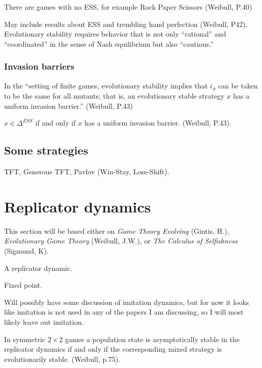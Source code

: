 There are games with no ESS, for example Rock Paper Scissors (Weibull, P.40)

May include results about ESS and trembling hand perfection (Weibull, P42). Evolutionary stability requires behavior that is not only ``rational'' and ``coordinated'' in the sense of Nash equilibrium but also ``cautious.''

\subsubsection{Invasion barriers}
In the ``setting of finite games, evolutionary stability implies that $\bar{\epsilon}_y$ can be taken to be the same for all mutants; that is, an evolutionary stable strategy $x$ has a uniform invasion barrier.'' (Weibull, P.43)
\begin{proposition}
$x \in \Delta^{ESS}$ if and only if $x$ has a uniform invasion barrier. (Weibull, P.43).
\end{proposition}


\subsection{Some strategies}
TFT, Generous TFT, Pavlov (Win-Stay, Lose-Shift).

\section{Replicator dynamics}
This section will be based either on \emph{Game Theory Evolving} (Gintis, H.), \emph{Evolutionary Game Theory} (Weibull, J.W.), or \emph{The Calculus of Selfishness} (Sigmund, K).

\begin{definition}
A replicator dynamic.
\end{definition}

\begin{definition}
Fixed point.
\end{definition}

Will possibly have some discussion of imitation dynamics, but for now it looks like imitation is not used in any of the papers I am discussing, so I will most likely leave out imitation.
\begin{theorem}
In symmetric $2 \times 2$ games a population state is asymptotically stable in the replicator dynamics if and only if the corresponding mixed strategy is evolutionarily stable. (Weibull, p.75).
\end{theorem}

